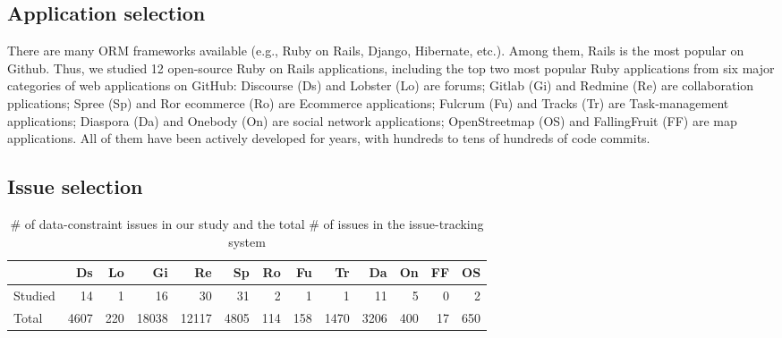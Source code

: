\subsection{Application selection}
 There are many ORM frameworks available (e.g., Ruby on Rails, Django, Hibernate, etc.). Among them, Rails is the most popular on Github. 
Thus, we studied 12
open-source Ruby on Rails applications, including the top two most popular Ruby applications from six major categories of web applications on GitHub: Discourse (Ds) and Lobster (Lo) are forums; Gitlab (Gi) and Redmine (Re) are collaboration pplications; Spree (Sp) and Ror ecommerce (Ro) are Ecommerce applications; Fulcrum (Fu) and Tracks (Tr) are Task-management applications; Diaspora (Da) and Onebody (On) are social network applications; OpenStreetmap (OS) and FallingFruit (FF) are map applications. All of them have been actively developed for years, with hundreds to tens of hundreds of code commits. 

\subsection{Issue selection}
\begin{table} 
\centering 
\caption{\# of data-constraint issues in our study and the total \# of issues in the issue-tracking system}
\begin{tabular}{lrrrrrrrrrrrr}
\toprule
 & Ds & Lo & Gi & Re & Sp & Ro & Fu & Tr & Da & On & FF & OS\\
\midrule
Studied &14 & 1 & 16 & 30 & 31 & 2 & 1 & 1 & 11 & 5 & 0 & 2\\
\midrule
Total &4607 & 220 & 18038 & 12117 & 4805 & 114 &158 &1470 &3206 & 400 & 17 & 650\\
\bottomrule
\end{tabular}
\label{table:issueapp0}
\end{table}

